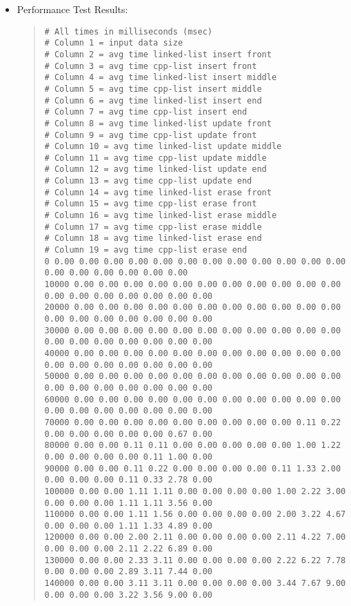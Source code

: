 \documentclass[10pt]{article}
\begin{document}
\begin{itemize}
\item Performance Test Results:
\begin{scriptsize}
\begin{quote}
\begin{verbatim}
# All times in milliseconds (msec)
# Column 1 = input data size
# Column 2 = avg time linked-list insert front
# Column 3 = avg time cpp-list insert front
# Column 4 = avg time linked-list insert middle
# Column 5 = avg time cpp-list insert middle
# Column 6 = avg time linked-list insert end
# Column 7 = avg time cpp-list insert end
# Column 8 = avg time linked-list update front
# Column 9 = avg time cpp-list update front
# Column 10 = avg time linked-list update middle
# Column 11 = avg time cpp-list update middle
# Column 12 = avg time linked-list update end
# Column 13 = avg time cpp-list update end
# Column 14 = avg time linked-list erase front
# Column 15 = avg time cpp-list erase front
# Column 16 = avg time linked-list erase middle
# Column 17 = avg time cpp-list erase middle
# Column 18 = avg time linked-list erase end
# Column 19 = avg time cpp-list erase end
0 0.00 0.00 0.00 0.00 0.00 0.00 0.00 0.00 0.00 0.00 0.00 0.00 0.00 0.00 0.00 0.00 0.00 0.00
10000 0.00 0.00 0.00 0.00 0.00 0.00 0.00 0.00 0.00 0.00 0.00 0.00 0.00 0.00 0.00 0.00 0.00 0.00
20000 0.00 0.00 0.00 0.00 0.00 0.00 0.00 0.00 0.00 0.00 0.00 0.00 0.00 0.00 0.00 0.00 0.00 0.00
30000 0.00 0.00 0.00 0.00 0.00 0.00 0.00 0.00 0.00 0.00 0.00 0.00 0.00 0.00 0.00 0.00 0.00 0.00
40000 0.00 0.00 0.00 0.00 0.00 0.00 0.00 0.00 0.00 0.00 0.00 0.00 0.00 0.00 0.00 0.00 0.00 0.00
50000 0.00 0.00 0.00 0.00 0.00 0.00 0.00 0.00 0.00 0.00 0.00 0.00 0.00 0.00 0.00 0.00 0.00 0.00
60000 0.00 0.00 0.00 0.00 0.00 0.00 0.00 0.00 0.00 0.00 0.00 0.00 0.00 0.00 0.00 0.00 0.00 0.00
70000 0.00 0.00 0.00 0.00 0.00 0.00 0.00 0.00 0.00 0.11 0.22 0.00 0.00 0.00 0.00 0.00 0.67 0.00
80000 0.00 0.00 0.11 0.11 0.00 0.00 0.00 0.00 0.00 1.00 1.22 0.00 0.00 0.00 0.00 0.11 1.00 0.00
90000 0.00 0.00 0.11 0.22 0.00 0.00 0.00 0.00 0.11 1.33 2.00 0.00 0.00 0.00 0.11 0.33 2.78 0.00
100000 0.00 0.00 1.11 1.11 0.00 0.00 0.00 0.00 1.00 2.22 3.00 0.00 0.00 0.00 1.11 1.11 3.56 0.00
110000 0.00 0.00 1.11 1.56 0.00 0.00 0.00 0.00 2.00 3.22 4.67 0.00 0.00 0.00 1.11 1.33 4.89 0.00
120000 0.00 0.00 2.00 2.11 0.00 0.00 0.00 0.00 2.11 4.22 7.00 0.00 0.00 0.00 2.11 2.22 6.89 0.00
130000 0.00 0.00 2.33 3.11 0.00 0.00 0.00 0.00 2.22 6.22 7.78 0.00 0.00 0.00 2.89 3.11 7.44 0.00
140000 0.00 0.00 3.11 3.11 0.00 0.00 0.00 0.00 3.44 7.67 9.00 0.00 0.00 0.00 3.22 3.56 9.00 0.00

\end{verbatim}
\end{quote}
\end{scriptsize}
\end{itemize}
\end{document}

